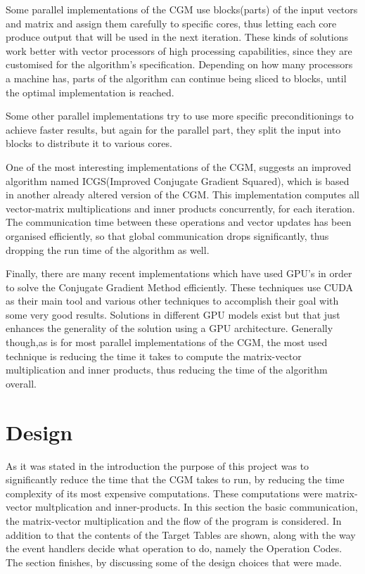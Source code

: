 \documentclass[12pt,a4paper]{article}
\begin{document}
Some parallel implementations of the CGM use blocks(parts) of the input vectors and matrix and assign them carefully to specific cores, thus letting each core produce output that will be used in the next iteration. These kinds of solutions work better with vector processors of high processing capabilities, since they are customised for the algorithm's specification. Depending on how many processors a machine has, parts of the algorithm can continue being sliced to blocks, until the optimal implementation is reached\cite{o1987parallel}.

Some other parallel implementations try to use more specific preconditionings to achieve faster results, but again for the parallel part, they split the input into blocks to distribute it to various cores\cite{adams1985m}\cite{adams1983m}. 

One of the most interesting implementations of the CGM, suggests an improved algorithm named ICGS(Improved Conjugate Gradient Squared), which is based in another already altered version of the CGM\cite{maheswaran1999mcgs}. This implementation computes all vector-matrix  multiplications and inner products concurrently, for each iteration. The communication time between these operations and vector updates has been organised efficiently, so that global communication drops significantly, thus dropping the run time of the algorithm as well\cite{yang2001improved}.

Finally, there are many recent implementations which have used GPU's in order to solve the Conjugate Gradient Method efficiently. These techniques use CUDA as their main tool and various other techniques to accomplish their goal with some very good results. Solutions in different GPU models exist but that just enhances the generality of the solution using a GPU architecture. Generally though,as is for most parallel implementations of the CGM, the most used technique is reducing the time it takes to compute the matrix-vector multiplication and inner products, thus reducing the time of the algorithm overall\cite{galiano2012gpu}\cite{wozniak2010parallel}.
\section{Design}
As it was stated in the introduction the purpose of this project was to significantly reduce the time that the CGM takes to run, by reducing the time complexity of its most expensive computations. These computations were matrix-vector multplication and inner-products. In this section the basic communication, the matrix-vector multiplication and the flow of the program is considered. In addition to that the contents of the Target Tables are shown, along with the way the event handlers decide what operation to do, namely the Operation Codes. The section finishes, by discussing some of the design choices that were made. 
\end{document}
